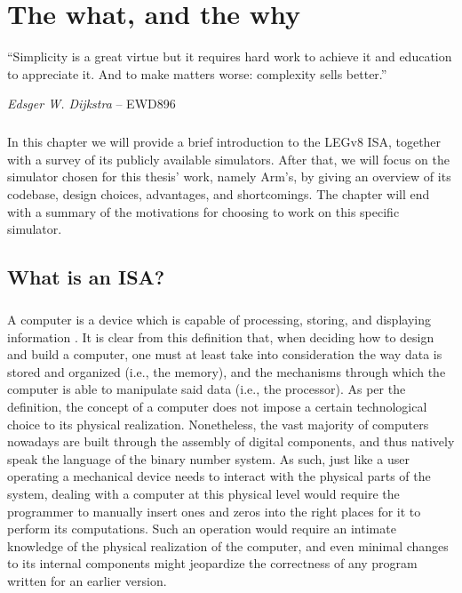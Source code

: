 \chapter{The what, and the why}\label{chap:chap1}

\epigraph{``Simplicity is a great virtue but it requires hard work to achieve it and education to appreciate it. And to make matters worse: complexity sells better.''}{\textit{Edsger W. Dijkstra} -- EWD896}

\paragraph{}
In this chapter we will provide a brief introduction to the LEGv8 ISA, together with a survey of its publicly available simulators. After that, we will focus on the simulator chosen for this thesis' work, namely Arm's, by giving an overview of its codebase, design choices, advantages, and shortcomings. The chapter will end with a summary of the motivations for choosing to work on this specific simulator. 

\section{What is an ISA?}

\paragraph{}
A computer is a device which is capable of processing, storing, and displaying information \cite{computerdefweb}.
It is clear from this definition that, when deciding how to design and build a computer, one must at least take into consideration the way data is 
stored and organized (i.e., the memory), and the mechanisms through which the computer is able to manipulate said data (i.e., the processor).
As per the definition, the concept of a computer does not impose a certain technological choice to its physical realization. Nonetheless, the vast majority of computers nowadays
are built through the assembly of digital components, and thus natively speak the language of the binary number system.
As such, just like a user operating a mechanical device needs to interact with the physical parts of the system,  dealing with a computer at this physical level
would require the programmer to manually insert ones and zeros into the right places for it to perform its computations.
Such an operation would require an intimate knowledge of the physical realization of the computer, and even minimal
changes to its internal components might jeopardize the correctness of any program written for an earlier version.
